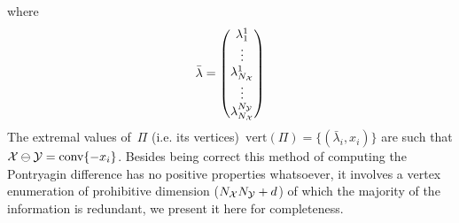 %
where
%
\[
\bar\lambda=\begin{pmatrix}\lambda_1^1\\ \vdots \\ \lambda^1_{N_\mathcal X} \\ \vdots \\ \lambda^{N_\mathcal Y}_{N_\mathcal X}\end{pmatrix}
\]
%
The extremal values of~$\Pi$ (i.e. its vertices)~$\text{vert}(\Pi)=\{(\bar\lambda_i,x_i)\}$ are such that $\mathcal X\ominus\mathcal Y=\text{conv}\{-x_i\}$.
%
Besides being correct this method of computing the Pontryagin difference has no positive properties whatsoever, it involves a vertex enumeration of prohibitive dimension ($N_\mathcal X N_\mathcal Y+d$) of which the majority of the information is redundant, we present it here for completeness.